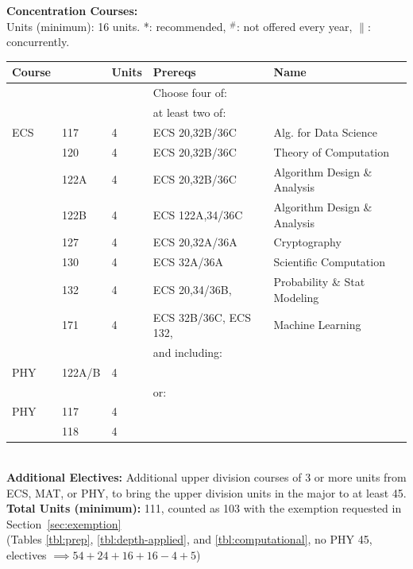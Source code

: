 \documentclass[12pt]{article}
\begin{document}
\vskip 0.25cm
\noindent
{\bf Concentration Courses:  }\\
Units (minimum):  16 units. *: recommended, $^\#$: not offered every year, $\parallel$: concurrently.\\
\begin{tabular}{|lllll|}
\hline
Course & & Units & Prereqs & Name \\
\hline
    & & & Choose four of: & \\
\hline
    & & & at least two of: & \\
\hline
ECS & 117  & 4 & ECS 20,32B/36C & Alg. for Data Science\\
    & 120  & 4 & ECS 20,32B/36C & Theory of Computation \\
    & 122A & 4 & ECS 20,32B/36C & Algorithm Design \& Analysis \\
    & 122B & 4 & ECS 122A,34/36C& Algorithm Design \& Analysis\\
    & 127  & 4 & ECS 20,32A/36A & Cryptography \\
    & 130  & 4 & ECS 32A/36A & Scientific Computation \\
    & 132  & 4 & ECS 20,34/36B,  & Probability \& Stat Modeling \\
    & 171  & 4 & ECS 32B/36C, ECS 132, & Machine Learning \\
\hline
    & & & and including: & \\
PHY & 122A/B & 4 & & \\
\hline
    & & & or: & \\
PHY    & 117   & 4 & & \\
       & 118   & 4 & & \\
\hline
\end{tabular}\\
\vskip 0.25cm
\noindent
{\bf Additional Electives:} Additional upper division courses of 3 or more units from ECS, MAT, or PHY, to bring the upper division units in the major to at least 45.\\
{\bf Total Units (minimum):} 111, counted as 103 with the exemption requested in Section~\ref{sec:exemption} \\
(Tables \ref{tbl:prep}, \ref{tbl:depth-applied}, and \ref{tbl:computational}, no PHY 45, electives $\implies 54+24+16+16-4+5$)

\end{document}
